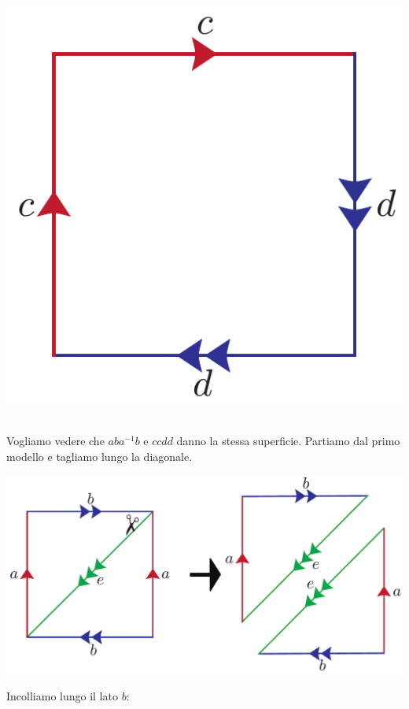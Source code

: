 \begin{observe}
\begin{minipage}{.24\linewidth}
\begin{center}
		\includegraphics[trim=0cm 0cm 0cm 0cm, clip, scale=0.3]{images/projdouble.pdf}
	\end{center}
\end{minipage}\\
Vogliamo vedere che $aba^{-1}b$ e $ccdd$ danno la stessa superficie. Partiamo dal primo modello e tagliamo lungo la diagonale.
\vspace{-3mm}
\begin{center}
	\includegraphics[trim=0cm 0cm 0cm 0cm, clip, scale=0.3]{images/kleintoprojdouble1.pdf}
\end{center}
\vspace{-3mm}
Incolliamo lungo il lato $b$:
\vspace{-3mm}

\end{observe}
